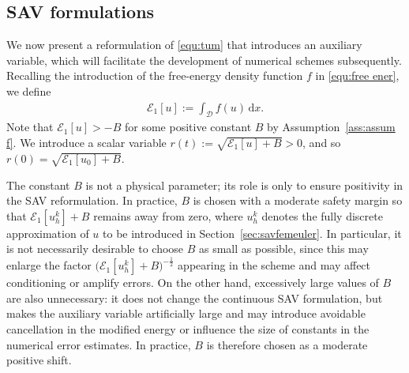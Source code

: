\documentclass[11pt, reqno]{amsart}
\theoremstyle{definition}
\numberwithin{equation}{section}
\newcommand{\dx}{\mathrm{d}x}
\begin{document}
\subsection{SAV formulations}

We now present a reformulation of \eqref{equ:tum} that introduces an auxiliary variable, which will facilitate the development of numerical schemes subsequently.
{Recalling the introduction of the free-energy density function $f$ in \eqref{equ:free ener}, we define}
\begin{align}\label{equ:E1 u}
	\mathcal{E}_1[u] := \int_\mathscr{D} f(u) \,\dx.
\end{align}
Note that $\mathcal{E}_1[u]> -B$ for some {positive} constant $B$ by Assumption~\ref{ass:assum f}. We introduce a scalar variable $r(t):= \sqrt{\mathcal{E}_1[u]+B}>0$, and so $r(0)= \sqrt{\mathcal{E}_1[u_0]+B}$. 

{The constant $B$ is not a physical parameter; its role is only to ensure positivity in the SAV reformulation. In practice, $B$ is chosen with a moderate safety margin so that $\mathcal{E}_1[u_h^k]+B$ remains away from zero, where $u_h^k$ denotes the fully discrete approximation of $u$ to be introduced in Section~\ref{sec:savfemeuler}. In particular, it is not necessarily desirable to choose $B$ as small as possible, since this may enlarge the factor $\big(\mathcal{E}_1[u_h^k]+B\big)^{-\frac12}$ appearing in the scheme and may affect conditioning or amplify errors. On the other hand, excessively large values of $B$ are also unnecessary: it does not change the continuous SAV formulation, but makes the auxiliary variable artificially large and may introduce avoidable cancellation in the modified energy or influence the size of constants in the numerical error estimates. In practice, $B$ is therefore chosen as a moderate positive shift.}
\end{document}
